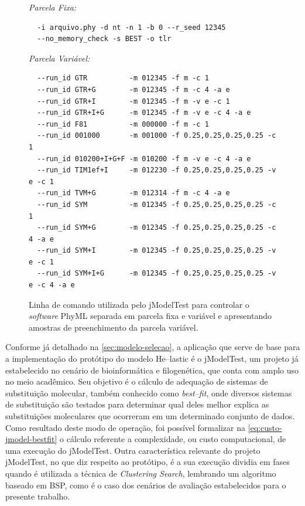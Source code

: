 \documentclass[english,brazilian]{UNISINOSmonografia} %
\begin{document}
\begin{figure}[tb]
	\centering%
	\begin{minipage}{\textwidth}
		\caption{Linha de comando utilizada pelo jModelTest para controlar o \textit{software} PhyML separada em parcela fixa e variável e apresentando amostras de preenchimento da parcela variável.}
		\label{fig:prototipo-phyml-cmdline}
		\vspace{1ex}
		\begin{footnotesize}
			\textsf{\emph{Parcela Fixa:}}
			\begin{verbatim}
  -i arquivo.phy -d nt -n 1 -b 0 --r_seed 12345
  --no_memory_check -s BEST -o tlr
			\end{verbatim}
			\textsf{\emph{Parcela Variável:}}
			\begin{verbatim}
  --run_id GTR          -m 012345 -f m -c 1
  --run_id GTR+G        -m 012345 -f m -c 4 -a e
  --run_id GTR+I        -m 012345 -f m -v e -c 1
  --run_id GTR+I+G      -m 012345 -f m -v e -c 4 -a e
  --run_id F81          -m 000000 -f m -c 1 
  --run_id 001000       -m 001000 -f 0.25,0.25,0.25,0.25 -c 1
  --run_id 010200+I+G+F -m 010200 -f m -v e -c 4 -a e
  --run_id TIM1ef+I     -m 012230 -f 0.25,0.25,0.25,0.25 -v e -c 1
  --run_id TVM+G        -m 012314 -f m -c 4 -a e
  --run_id SYM          -m 012345 -f 0.25,0.25,0.25,0.25 -c 1
  --run_id SYM+G        -m 012345 -f 0.25,0.25,0.25,0.25 -c 4 -a e
  --run_id SYM+I        -m 012345 -f 0.25,0.25,0.25,0.25 -v e -c 1
  --run_id SYM+I+G      -m 012345 -f 0.25,0.25,0.25,0.25 -v e -c 4 -a e
			\end{verbatim}
		\end{footnotesize}
	\end{minipage}
\end{figure}


Conforme já detalhado na \autoref{sec:modelo-selecao}, a aplicação que serve de base para a implementação do protótipo do modelo \textsf{He}--lastic é o jModelTest, um projeto já estabelecido no cenário de bioinformática e filogenética, que conta com amplo uso no meio acadêmico.
Seu objetivo é o cálculo de adequação de sistemas de substituição molecular, também conhecido como \textit{best--fit}, onde diversos sistemas de substituição são testados para determinar qual deles melhor explica as substituições moleculares que ocorreram em um determinado conjunto de dados.
Como resultado deste modo de operação, foi possível formalizar na \autoref{eq:custo-jmodel-bestfit} o cálculo referente a complexidade, ou custo computacional, de uma execução do jModelTest.
Outra característica relevante do projeto jModelTest, no que diz respeito ao protótipo, é a sua execução dividia em fases quando é utilizada a técnica de \textit{Clustering Search}, lembrando um algoritmo baseado em BSP, como é o caso dos cenários de avaliação estabelecidos para o presente trabalho.
\end{document}
